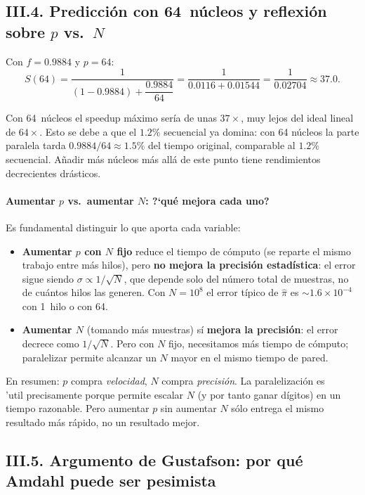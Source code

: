 \documentclass[12pt,a4paper]{article}
\begin{document}
\subsection*{III.4. Predicci\'on con 64~n\'ucleos y reflexi\'on sobre $p$ vs.\ $N$}

Con $f=0.9884$ y $p=64$:
\[
S(64) = \frac{1}{(1-0.9884) + \dfrac{0.9884}{64}}
      = \frac{1}{0.0116 + 0.01544}
      = \frac{1}{0.02704}
      \approx 37.0.
\]

Con 64~n\'ucleos el speedup m\'aximo ser\'ia de unas $37\times$, muy lejos del ideal lineal de $64\times$. Esto se debe a que el $1.2\%$ secuencial ya domina: con 64 n\'ucleos la parte paralela tarda $0.9884/64 \approx 1.5\%$ del tiempo original, comparable al $1.2\%$ secuencial. A\~nadir m\'as n\'ucleos m\'as all\'a de este punto tiene rendimientos decrecientes dr\'asticos.

\paragraph{Aumentar $p$ vs.\ aumentar $N$: ?`qu\'e mejora cada uno?}
Es fundamental distinguir lo que aporta cada variable:
\begin{itemize}
  \item \textbf{Aumentar $p$ con $N$ fijo} reduce el tiempo de c\'omputo (se reparte el mismo trabajo entre m\'as hilos), pero \textbf{no mejora la precisi\'on estad\'istica}: el error sigue siendo $\sigma \propto 1/\sqrt{N}$, que depende solo del n\'umero total de muestras, no de cu\'antos hilos las generen. Con $N=10^8$ el error t\'ipico de $\hat\pi$ es ${\sim}1.6\times10^{-4}$ con 1~hilo o con 64.

  \item \textbf{Aumentar $N$} (tomando m\'as muestras) s\'i \textbf{mejora la precisi\'on}: el error decrece como $1/\sqrt{N}$. Pero con $N$ fijo, necesitamos m\'as tiempo de c\'omputo; paralelizar permite alcanzar un $N$ mayor en el mismo tiempo de pared.
\end{itemize}

En resumen: $p$ compra \emph{velocidad}, $N$ compra \emph{precisi\'on}. La paralelizaci\'on es \\'util precisamente porque permite escalar $N$ (y por tanto ganar d\'igitos) en un tiempo razonable. Pero aumentar $p$ sin aumentar $N$ s\'olo entrega el mismo resultado m\'as r\'apido, no un resultado mejor.

\subsection*{III.5. Argumento de Gustafson: por qu\'e Amdahl puede ser pesimista}
\end{document}
